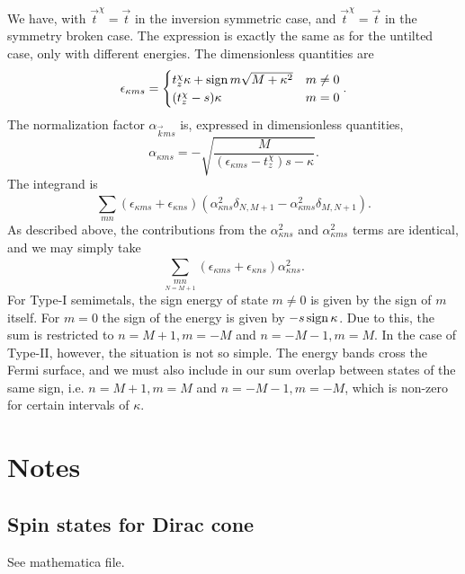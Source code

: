 We have, with \( \vec{t}^{\chi } = \vec{t} \) in the inversion symmetric case, and \( \vec{t}^{\chi } = \vec{t} \) in the symmetry broken case.
The expression is exactly the same as for the untilted case, only with different energies.
The dimensionless quantities are
\begin{equation}
  \label{eq:71}
  \epsilon_{\kappa m s} =
  \begin{cases}
    t_z^{\chi } \kappa + \operatorname{sign}{m} \sqrt{M + \kappa ^2} & m \neq 0\\
    (t_z^{\chi } - s) \kappa & m = 0
  \end{cases}.
\end{equation}
The normalization factor \( \alpha _{\vec{k} m s} \) is, expressed in dimensionless quantities,
\begin{equation}
  \label{eq:72}
  \alpha _{\kappa m s} =
  -\sqrt{\frac{M}{(\epsilon_{\kappa  m s} - t_{z}^{\chi })s - \kappa }}.
\end{equation}
The integrand is
\begin{equation}
  \label{eq:73}
  \sum\limits_{mn}^{}
  (\epsilon_{\kappa m s} + \epsilon_{\kappa n s}) (\alpha_{\kappa n s}^2 \delta _{N, M+1}- \alpha_{\kappa m s}^2 \delta_{M, N+1}).
\end{equation}
As described above, the contributions from the \( \alpha _{\kappa n s}^2  \) and \( \alpha _{\kappa m s}^2 \) terms are identical, and we may simply take
\begin{equation}
  \label{eq:74}
  \sum\limits_{\underset{N=M+1}{mn}}^{}
  (\epsilon_{\kappa m s} + \epsilon_{\kappa n s}) \alpha_{\kappa n s}^2.
\end{equation}
For Type-I semimetals, the sign energy of state \( m \neq 0 \) is given by the sign of \( m \) itself.
For \( m = 0 \) the sign of the energy is given by \( -s \operatorname{sign}{\kappa } \).
Due to this, the sum is restricted to \( n=M+1, m=-M \) and \( n=-M-1, m=M \).
In the case of Type-II, however, the situation is not so simple.
The energy bands cross the Fermi surface, and we must also include in our sum overlap between states of the same sign, i.e. \( n=M+1, m=M \) and \( n=-M-1, m=-M \), which is non-zero for certain intervals of \( \kappa  \).


\section{Notes}
\subsection{Spin states for Dirac cone}
See mathematica file.

